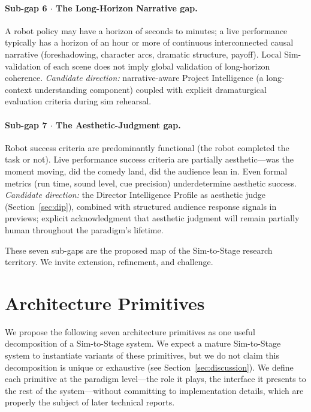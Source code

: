 \documentclass[11pt]{article}
\begin{document}
\paragraph{Sub-gap 6 $\cdot$ The Long-Horizon Narrative gap.}
A robot policy may have a horizon of seconds to minutes; a live performance
typically has a horizon of an hour or more of continuous interconnected
causal narrative (foreshadowing, character arcs, dramatic structure,
payoff).  Local Sim-validation of each scene does not imply global
validation of long-horizon coherence.  \textit{Candidate direction:}
narrative-aware Project Intelligence (a long-context understanding
component) coupled with explicit dramaturgical evaluation criteria during
sim rehearsal.

\paragraph{Sub-gap 7 $\cdot$ The Aesthetic-Judgment gap.}
Robot success criteria are predominantly functional (the robot completed
the task or not).  Live performance success criteria are partially
aesthetic---was the moment moving, did the comedy land, did the audience
lean in.  Even formal metrics (run time, sound level, cue precision)
underdetermine aesthetic success.  \textit{Candidate direction:} the
Director Intelligence Profile as aesthetic judge
(Section~\ref{sec:dip}), combined with structured audience response
signals in previews; explicit acknowledgment that aesthetic judgment will
remain partially human throughout the paradigm's lifetime.

These seven sub-gaps are the proposed map of the Sim-to-Stage research
territory.  We invite extension, refinement, and challenge.

\section{Architecture Primitives}
\label{sec:primitives}

We propose the following seven architecture primitives as one useful
decomposition of a Sim-to-Stage system.  We expect a mature Sim-to-Stage
system to instantiate variants of these primitives, but we do not claim
this decomposition is unique or exhaustive
(see Section~\ref{sec:discussion}).  We define each primitive at the
paradigm level---the role it plays, the interface it presents to the rest
of the system---without committing to implementation details, which are
properly the subject of later technical reports.
\end{document}
